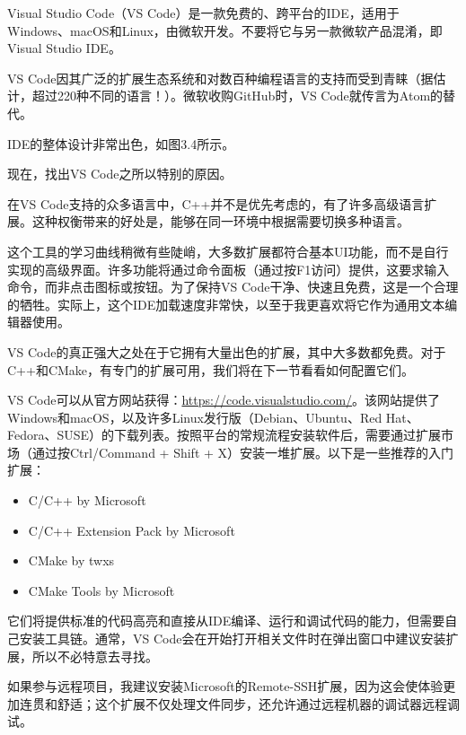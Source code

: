 
Visual Studio Code（VS Code）是一款免费的、跨平台的IDE，适用于Windows、macOS和Linux，由微软开发。不要将它与另一款微软产品混淆，即Visual Studio IDE。

VS Code因其广泛的扩展生态系统和对数百种编程语言的支持而受到青睐（据估计，超过220种不同的语言！）。微软收购GitHub时，VS Code就传言为Atom的替代。

IDE的整体设计非常出色，如图3.4所示。


现在，找出VS Code之所以特别的原因。


在VS Code支持的众多语言中，C++并不是优先考虑的，有了许多高级语言扩展。这种权衡带来的好处是，能够在同一环境中根据需要切换多种语言。

这个工具的学习曲线稍微有些陡峭，大多数扩展都符合基本UI功能，而不是自行实现的高级界面。许多功能将通过命令面板（通过按F1访问）提供，这要求输入命令，而非点击图标或按钮。为了保持VS Code干净、快速且免费，这是一个合理的牺牲。实际上，这个IDE加载速度非常快，以至于我更喜欢将它作为通用文本编辑器使用。

VS Code的真正强大之处在于它拥有大量出色的扩展，其中大多数都免费。对于C++和CMake，有专门的扩展可用，我们将在下一节看看如何配置它们。


VS Code可以从官方网站获得：\url{https://code.visualstudio.com/}。该网站提供了Windows和macOS，以及许多Linux发行版（Debian、Ubuntu、Red Hat、Fedora、SUSE）的下载列表。按照平台的常规流程安装软件后，需要通过扩展市场（通过按Ctrl/Command + Shift + X）安装一堆扩展。以下是一些推荐的入门扩展：

\begin{itemize}
\item
C/C++ by Microsoft

\item
C/C++ Extension Pack by Microsoft

\item
CMake by twxs

\item
CMake Tools by Microsoft
\end{itemize}

它们将提供标准的代码高亮和直接从IDE编译、运行和调试代码的能力，但需要自己安装工具链。通常，VS Code会在开始打开相关文件时在弹出窗口中建议安装扩展，所以不必特意去寻找。

如果参与远程项目，我建议安装Microsoft的Remote-SSH扩展，因为这会使体验更加连贯和舒适；这个扩展不仅处理文件同步，还允许通过远程机器的调试器远程调试。

